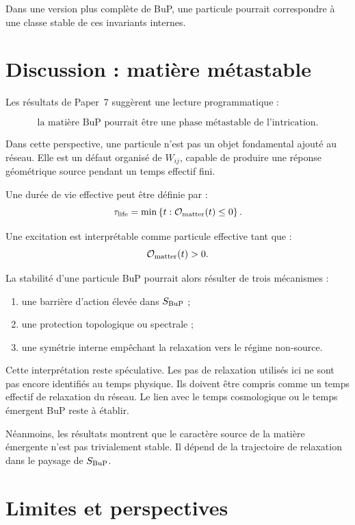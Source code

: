 \documentclass[11pt,a4paper]{article}
\begin{document}
Dans une version plus complète de BuP, une particule pourrait correspondre à une
classe stable de ces invariants internes.

\section{Discussion : matière métastable}

Les résultats de Paper~7 suggèrent une lecture programmatique :

\[
\boxed{
\text{la matière BuP pourrait être une phase métastable de l'intrication.}
}
\]

Dans cette perspective, une particule n'est pas un objet fondamental ajouté au
réseau. Elle est un défaut organisé de \(W_{ij}\), capable de produire une
réponse géométrique source pendant un temps effectif fini.

Une durée de vie effective peut être définie par :
\[
\tau_{\rm life}
=
\min
\left\{
t:
\mathcal{O}_{\rm matter}(t)\leq0
\right\}.
\]

Une excitation est interprétable comme particule effective tant que :
\[
\mathcal{O}_{\rm matter}(t)>0.
\]

La stabilité d'une particule BuP pourrait alors résulter de trois mécanismes :

\begin{enumerate}
  \item une barrière d'action élevée dans \(S_{\rm BuP}\) ;
  \item une protection topologique ou spectrale ;
  \item une symétrie interne empêchant la relaxation vers le régime non-source.
\end{enumerate}

Cette interprétation reste spéculative. Les pas de relaxation utilisés ici ne
sont pas encore identifiés au temps physique. Ils doivent être compris comme un
temps effectif de relaxation du réseau. Le lien avec le temps cosmologique ou le
temps émergent BuP reste à établir.

Néanmoins, les résultats montrent que le caractère source de la matière
émergente n'est pas trivialement stable. Il dépend de la trajectoire de
relaxation dans le paysage de \(S_{\rm BuP}\).

\section{Limites et perspectives}
\end{document}
